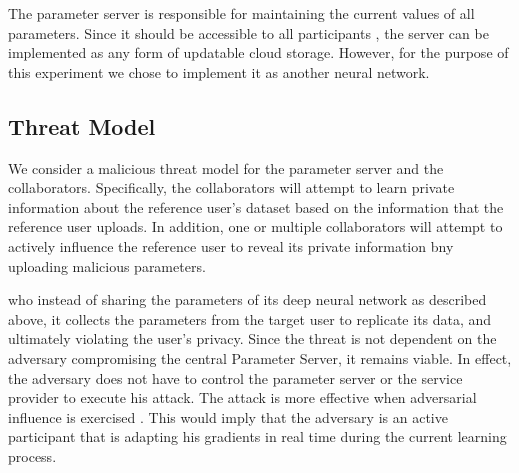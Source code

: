 \documentclass[conference]{IEEEtran}
\begin{document}
The parameter server is responsible for maintaining the current values of all parameters. Since it should be accessible to all
participants , the server can be implemented as any form of updatable cloud storage. However, for the purpose of this experiment we
chose to implement it as another neural network. 



\subsection{Threat Model}

We consider a malicious threat model for the parameter server and the collaborators. Specifically, the collaborators will
attempt to learn private information about the reference user's dataset based on the information that the reference user uploads. 
In addition, one or multiple  collaborators will attempt to actively influence the reference user to reveal its private information bny
 uploading malicious parameters. 

who instead of sharing the parameters of its deep neural
network as described above, it collects the parameters from the target user to replicate its data, and ultimately violating the user's
privacy.  
Since the threat is not{} dependent on the adversary compromising the
central Parameter Server, it remains viable. In effect, the adversary does not have to control the parameter server or the service
provider to execute his attack. The attack is more effective when adversarial influence is exercised \cite{hitaj2017deep}. This would
imply that
the adversary is an active participant that is adapting his gradients in real time during the current learning process.


\end{document}
